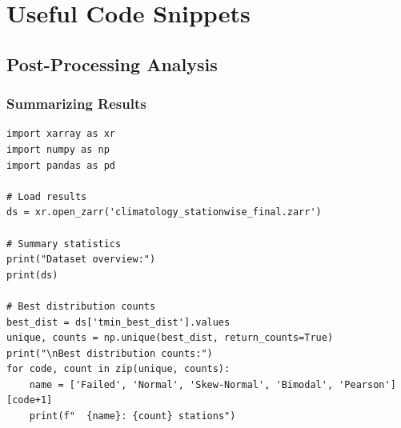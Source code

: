﻿\documentclass[12pt,a4paper]{report}
\begin{document}
\appendix

\chapter{Useful Code Snippets}

\section{Post-Processing Analysis}

\subsection{Summarizing Results}
\begin{lstlisting}[caption=Summarizing Results]
import xarray as xr
import numpy as np
import pandas as pd

# Load results
ds = xr.open_zarr('climatology_stationwise_final.zarr')

# Summary statistics
print("Dataset overview:")
print(ds)

# Best distribution counts
best_dist = ds['tmin_best_dist'].values
unique, counts = np.unique(best_dist, return_counts=True)
print("\nBest distribution counts:")
for code, count in zip(unique, counts):
    name = ['Failed', 'Normal', 'Skew-Normal', 'Bimodal', 'Pearson'][code+1]
    print(f"  {name}: {count} stations")
\end{lstlisting}
\end{document}
